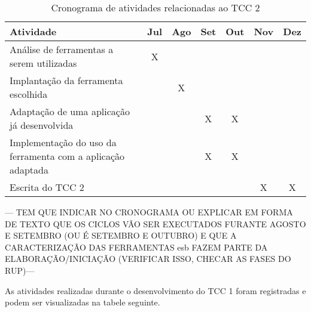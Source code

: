 \begin{table}[!h]
\centering
\caption{Cronograma de atividades relacionadas ao TCC 2}
\label{cronograma_tcc2}
\begin{tabular}{|p{9cm}|c|c|c|c|c|c|}
\hline
Atividade                                                   & \multicolumn{1}{l|}{Jul} & \multicolumn{1}{l|}{Ago} & \multicolumn{1}{l|}{Set} & \multicolumn{1}{l|}{Out} & \multicolumn{1}{l|}{Nov} & \multicolumn{1}{l|}{Dez} \\ \hline
Análise de ferramentas a serem utilizadas                   & X                           &                             &                              &                            &                             &                              \\ \hline
Implantação da ferramenta escolhida                         &                             & X                            &                              &                            &                             &                              \\ \hline
Adaptação de uma aplicação já desenvolvida                  &                             &                               & X                            & X                          &                             &                              \\ \hline
Implementação do uso da ferramenta com a aplicação adaptada &                             &                         & X                            & X                          &                             &                              \\ \hline
Escrita do TCC 2                                            &                             &                             &                              &                            & X                           & X          \\ \hline
\end{tabular}
\end{table}



--- TEM QUE INDICAR NO CRONOGRAMA OU EXPLICAR EM FORMA DE TEXTO QUE OS CICLOS VÃO SER EXECUTADOS  FURANTE AGOSTO E SETEMBRO (OU É SETEMBRO E OUTUBRO) E QUE A CARACTERIZAÇÃO DAS FERRAMENTAS esb FAZEM PARTE DA ELABORAÇÃO/INICIAÇÃO (VERIFICAR ISSO, CHECAR AS FASES DO RUP)---


As atividades realizadas durante o desenvolvimento do TCC 1 foram registradas e podem ser visualizadas na tabele seguinte.


